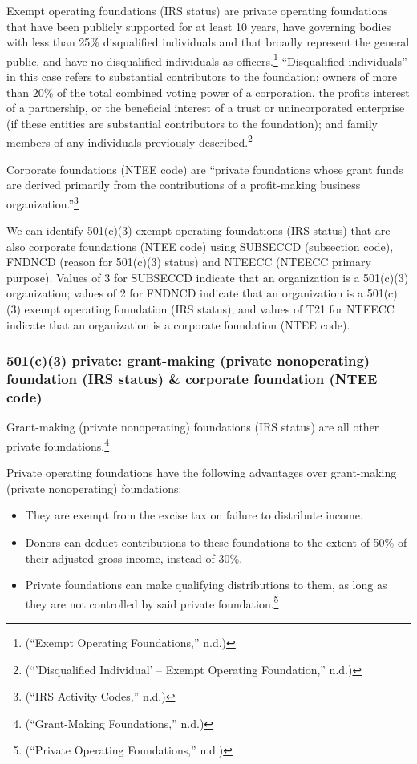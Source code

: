 \documentclass[
  letterpaper,
  DIV=11,
  numbers=noendperiod,
  oneside]{scrreprt}
\providecommand{\tightlist}{%
  \setlength{\itemsep}{0pt}\setlength{\parskip}{0pt}}\usepackage{longtable,booktabs,array}
\begin{document}
Exempt operating foundations (IRS status) are private operating
foundations that have been publicly supported for at least 10 years,
have governing bodies with less than 25\% disqualified individuals and
that broadly represent the general public, and have no disqualified
individuals as officers.\footnote{({``Exempt Operating Foundations,''}
  n.d.)} ``Disqualified individuals'' in this case refers to substantial
contributors to the foundation; owners of more than 20\% of the total
combined voting power of a corporation, the profits interest of a
partnership, or the beneficial interest of a trust or unincorporated
enterprise (if these entities are substantial contributors to the
foundation); and family members of any individuals previously
described.\footnote{({``'Disqualified Individual' -- Exempt Operating
  Foundation,''} n.d.)}

Corporate foundations (NTEE code) are ``private foundations whose grant
funds are derived primarily from the contributions of a profit-making
business organization.''\footnote{({``IRS Activity Codes,''} n.d.)}

We can identify 501(c)(3) exempt operating foundations (IRS status) that
are also corporate foundations (NTEE code) using SUBSECCD (subsection
code), FNDNCD (reason for 501(c)(3) status) and NTEECC (NTEECC primary
purpose). Values of 3 for SUBSECCD indicate that an organization is a
501(c)(3) organization; values of 2 for FNDNCD indicate that an
organization is a 501(c)(3) exempt operating foundation (IRS status),
and values of T21 for NTEECC indicate that an organization is a
corporate foundation (NTEE code).

\hypertarget{c3-private-grant-making-private-nonoperating-foundation-irs-status-corporate-foundation-ntee-code}{%
\subsubsection{501(c)(3) private: grant-making (private nonoperating)
foundation (IRS status) \& corporate foundation (NTEE
code)}\label{c3-private-grant-making-private-nonoperating-foundation-irs-status-corporate-foundation-ntee-code}}

Grant-making (private nonoperating) foundations (IRS status) are all
other private foundations.\footnote{({``Grant-Making Foundations,''}
  n.d.)}

Private operating foundations have the following advantages over
grant-making (private nonoperating) foundations:

\begin{itemize}
\tightlist
\item
  They are exempt from the excise tax on failure to distribute income.
\item
  Donors can deduct contributions to these foundations to the extent of
  50\% of their adjusted gross income, instead of 30\%.
\item
  Private foundations can make qualifying distributions to them, as long
  as they are not controlled by said private foundation.\footnote{({``Private
    Operating Foundations,''} n.d.)}
\end{itemize}
\end{document}
